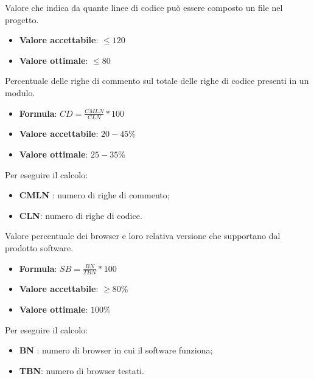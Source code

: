 Valore che indica da quante linee di codice può essere composto un file nel progetto.
\begin{itemize}
    \item \textbf{Valore accettabile}: $\leq120$
    \item \textbf{Valore ottimale}: $\leq80$
\end{itemize} 

Percentuale delle righe di commento sul totale delle righe di codice presenti in un modulo.
\begin{itemize}
    \item \textbf{Formula}: $CD=\frac{CMLN}{CLN}*100$
    \item \textbf{Valore accettabile}: $20-45\%$
    \item \textbf{Valore ottimale}: $25-35\%$
\end{itemize}  
Per eseguire il calcolo:
\begin{itemize}
    \item \textbf{CMLN} : numero di righe di commento;
    \item \textbf{CLN}: numero di righe di codice.
\end{itemize}

Valore percentuale dei browser e loro relativa versione che supportano dal prodotto software.
\begin{itemize}
    \item \textbf{Formula}: $SB=\frac{BN}{TBN}*100$
    \item \textbf{Valore accettabile}: $\geq80\%$
    \item \textbf{Valore ottimale}: $100\%$
\end{itemize}  
Per eseguire il calcolo:
\begin{itemize}
    \item \textbf{BN} : numero di browser in cui il software funziona;
    \item \textbf{TBN}: numero di browser testati.
\end{itemize}

